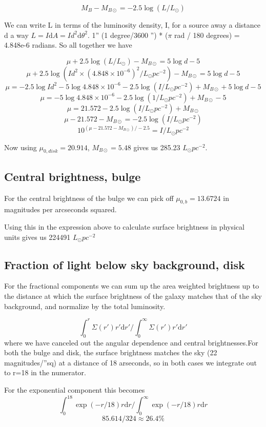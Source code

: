 \documentclass[12pt]{article}
\begin{document}
$$M_{B} - M_{B \odot} = -2.5\log(L / L_{\odot}) $$

We can write L in terms of the luminosity density, I, for a source away a distance d a way $L = I \mathrm{d}A = I d^2 \mathrm{d}\theta^2$. 1'' (1 degree/3600 '') * ($\pi$ rad / 180 degrees) = 4.848e-6 radians. So all together we have

$$ \mu  + 2.5\log(L / L_{\odot}) - M_{B \odot} = 5\log d - 5 $$
$$ \mu  + 2.5\log(Id^2  \times (4.848\times10^{-6})^{2} / L_{\odot}pc^{-2}) - M_{B \odot} = 5\log d - 5 $$
$$ \mu  = -2.5\log Id^2 - 5\log 4.848\times10^{-6} - 2.5\log( I/ L_{\odot}pc^{-2}) + M_{B \odot} + 5\log d - 5 $$
$$ \mu  =  - 5\log 4.848\times10^{-6}  - 2.5\log( 1/ L_{\odot}pc^{-2}) + M_{B \odot}  - 5 $$
$$ \mu  =  21.572 - 2.5\log( I/ L_{\odot}pc^{-2}) + M_{B \odot} $$
$$ \mu  -  21.572 - M_{B \odot} = - 2.5\log( I/ L_{\odot}pc^{-2}) $$
$$ 10^{(\mu  -  21.572 - M_{B \odot})/-2.5} =  I/ L_{\odot}pc^{-2} $$

Now using $\mu_{0,disk} = 20.914$, $M_{B\odot} = 5.48$ gives us 285.23 $L_{\odot} pc^{-2}$. 
\subsection{Central brightness, bulge}

For the central brightness of the bulge we can pick off $\mu_{0,b} = 13.6724$ in magnitudes per arcseconds squared. 

Using this in the expression above to calculate surface brightness in physical units gives us 224491 $L_{\odot} pc^{-2}$
\subsection{Fraction of light below sky background, disk}
For the fractional components we can sum up the area weighted brightness up to the distance at which the surface brightness of the galaxy matches that of the sky background, and normalize by the total luminosity. 

$$ \int^{r}_{0} \Sigma(r') r' \mathrm{d}r' / \int^{\infty}_{0} \Sigma(r') r' \mathrm{d}r' $$
where we have canceled out the angular dependence and central brightnesses.For both the bulge and disk, the surface brightness matches the sky (22 magnitudes/''sq) at a distance of 18 arseconds, so in both cases we integrate out to r=18 in the numerator.

For the exponential component this becomes
$$ \int^{18}_{0} \exp(-r/18)r \mathrm{d}r / \int^{\infty}_{0} \exp(-r/18)r \mathrm{d}r $$
$$ 85.614 / 324 \approx 26.4\%$$
\end{document}
